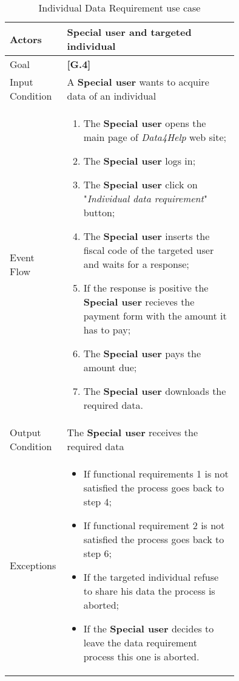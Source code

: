 \begin{center}
\begin{table}
\begin{tabular}{ | l | p{0.75\linewidth} | }
  \hline
    Actors & \textbf{Special user} and targeted individual \\ \hline
    Goal & \textbf{[G.4]} \\ \hline
    Input Condition & A \textbf{Special user} wants to acquire data of an individual \\ \hline
    Event Flow & \begin{minipage}[t]{0.7\textwidth}
      \begin{enumerate}
        \item The \textbf{Special user} opens the main page of \textit{Data4Help} web site;
        \item The \textbf{Special user} logs in;
        \item The \textbf{Special user} click on "\textit{Individual data requirement}" button;
        \item The \textbf{Special user} inserts the fiscal code of the targeted user and waits for a response;
        \item If the response is positive the \textbf{Special user} recieves the payment form with the amount it has to pay;
        \item The \textbf{Special user} pays the amount due;
        \item The \textbf{Special user} downloads the required data.
      \end{enumerate}
    \smallskip
  \end{minipage} \\ \hline
  Output Condition & The \textbf{Special user} receives the required data \\ \hline
  Exceptions & \begin{minipage}[t]{0.7\textwidth}
    \begin{itemize}
      \smallskip
      \item If functional requirements 1 is not satisfied the process goes back to step 4;
      \item If functional requirement 2 is not satisfied the process goes back to step 6;
      \item If the targeted individual refuse to share his data the process is aborted;
      \item If the \textbf{Special user} decides to leave the data requirement process this one is aborted.
    \end{itemize}
    \smallskip
  \end{minipage}  \\ \hline
\end{tabular}
\caption{Individual Data Requirement use case}
\label{table:individualDataRequirement}
\end{table}
\end{center}
